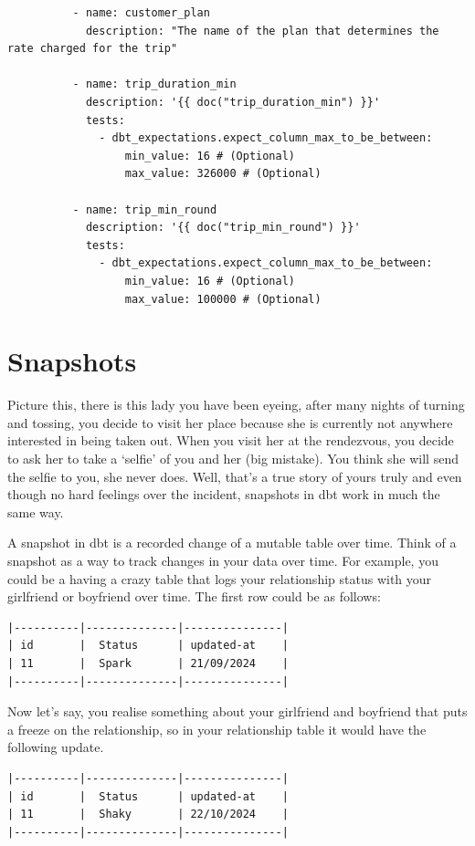 \documentclass[
]{book}
\begin{document}
\begin{verbatim}
          - name: customer_plan
            description: "The name of the plan that determines the rate charged for the trip"

          - name: trip_duration_min
            description: '{{ doc("trip_duration_min") }}'
            tests:
              - dbt_expectations.expect_column_max_to_be_between:
                  min_value: 16 # (Optional)
                  max_value: 326000 # (Optional)

          - name: trip_min_round
            description: '{{ doc("trip_min_round") }}'
            tests:
              - dbt_expectations.expect_column_max_to_be_between:
                  min_value: 16 # (Optional)
                  max_value: 100000 # (Optional)
\end{verbatim}

\hypertarget{snapshots}{%
\chapter{Snapshots}\label{snapshots}}

Picture this, there is this lady you have been eyeing, after many nights of turning and tossing, you decide to visit her place because she is currently not anywhere interested in being taken out. When you visit her at the rendezvous, you decide to ask her to take a `selfie' of you and her (big mistake). You think she will send the selfie to you, she never does. Well, that's a true story of yours truly and even though no hard feelings over the incident, snapshots in dbt work in much the same way.

A snapshot in dbt is a recorded change of a mutable table over time. Think of a snapshot as a way to track changes in your data over time. For example, you could be a having a crazy table that logs your relationship status with your girlfriend or boyfriend over time. The first row could be as follows:

\begin{verbatim}
|----------|--------------|---------------|
| id       |  Status      | updated-at    |
| 11       |  Spark       | 21/09/2024    |
|----------|--------------|---------------|
\end{verbatim}

Now let's say, you realise something about your girlfriend and boyfriend that puts a freeze on the relationship, so in your relationship table it would have the following update.

\begin{verbatim}
|----------|--------------|---------------|
| id       |  Status      | updated-at    |
| 11       |  Shaky       | 22/10/2024    |
|----------|--------------|---------------|
\end{verbatim}
\end{document}
